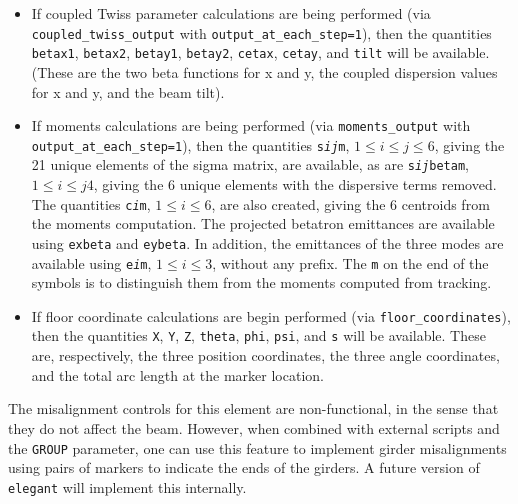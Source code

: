 \begin{itemize}
  {\tt alphax}, {\tt betax}, {\tt nux}, {\tt psix}, {\tt etax}, {\tt etapx}, and {\tt etaxp}, along with similarly-named
  quantities for the vertical plane, will be available, giving twiss parameter values at the marker location.
  Note that {\tt etapx} and {\tt etaxp} are the same, being alternate names for $\eta_x^\prime$.  If radiation integrals are requested,
  the values of the radiation integrals are available in the quantities {\tt I1}, {\tt I2}, etc.
\item If coupled Twiss parameter calculations are being performed (via {\tt coupled\_twiss\_output} with {\tt output\_at\_each\_step=1}),
  then the quantities  \verb|betax1|, \verb|betax2|, \verb|betay1|, \verb|betay2|, \verb|cetax|, \verb|cetay|, and \verb|tilt| will be available.
  (These are the two beta functions for x and y, the coupled dispersion values for x and y, and the beam tilt). 
\item If moments calculations are being performed (via {\tt moments\_output} with  {\tt output\_at\_each\_step=1}), then the quantities 
 {\tt s{\em i}{\em j}m}, $1 \leq i\leq j \leq 6$, giving the 21 unique elements of the sigma matrix, are available, as are
 {\tt s{\em i}{\em j}betam}, $1 \leq i \leq j 4$, giving the 6  unique elements with the dispersive terms removed.
 The quantities {\tt c{\em i}m}, $1\leq i \leq 6$,
 are also created, giving the 6 centroids from the moments computation. 
 The projected betatron emittances are available using {\tt exbeta} and {\tt eybeta}.
 In addition, the emittances of the three modes are available using 
 {\tt e{\em i}m}, $1\leq i \leq 3$, without any prefix.
 The {\tt m} on the end of the symbols is to distinguish them from the moments computed from tracking.
\item If floor coordinate calculations are begin performed (via {\tt floor\_coordinates}), then the quantities
  {\tt X}, {\tt Y}, {\tt Z}, {\tt theta}, {\tt phi}, {\tt psi}, and {\tt s} will be available.  These are,
  respectively, the three position coordinates, the three angle coordinates, and the total arc length
  at the marker location.
\end{itemize}

The misalignment controls for this element are non-functional, in the sense that they do not affect the beam.
However, when combined with external scripts and the \verb|GROUP| parameter, one can use this feature to
implement girder misalignments using pairs of markers to indicate the ends of the girders.  A future version
of {\tt elegant} will implement this internally.
